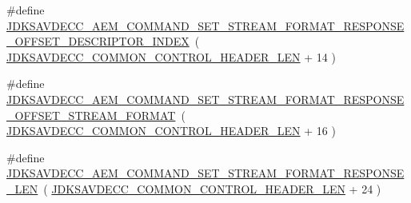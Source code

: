 \begin{DoxyCompactItemize}
\item 
\#define \hyperlink{group__command__set__stream__format__response_ga3fb2a3f714c01e45626ae8439f9d9793}{J\+D\+K\+S\+A\+V\+D\+E\+C\+C\+\_\+\+A\+E\+M\+\_\+\+C\+O\+M\+M\+A\+N\+D\+\_\+\+S\+E\+T\+\_\+\+S\+T\+R\+E\+A\+M\+\_\+\+F\+O\+R\+M\+A\+T\+\_\+\+R\+E\+S\+P\+O\+N\+S\+E\+\_\+\+O\+F\+F\+S\+E\+T\+\_\+\+D\+E\+S\+C\+R\+I\+P\+T\+O\+R\+\_\+\+I\+N\+D\+EX}~( \hyperlink{group__jdksavdecc__avtp__common__control__header_gaae84052886fb1bb42f3bc5f85b741dff}{J\+D\+K\+S\+A\+V\+D\+E\+C\+C\+\_\+\+C\+O\+M\+M\+O\+N\+\_\+\+C\+O\+N\+T\+R\+O\+L\+\_\+\+H\+E\+A\+D\+E\+R\+\_\+\+L\+EN} + 14 )
\item 
\#define \hyperlink{group__command__set__stream__format__response_gaab8a91838855f263277ddcf57418475a}{J\+D\+K\+S\+A\+V\+D\+E\+C\+C\+\_\+\+A\+E\+M\+\_\+\+C\+O\+M\+M\+A\+N\+D\+\_\+\+S\+E\+T\+\_\+\+S\+T\+R\+E\+A\+M\+\_\+\+F\+O\+R\+M\+A\+T\+\_\+\+R\+E\+S\+P\+O\+N\+S\+E\+\_\+\+O\+F\+F\+S\+E\+T\+\_\+\+S\+T\+R\+E\+A\+M\+\_\+\+F\+O\+R\+M\+AT}~( \hyperlink{group__jdksavdecc__avtp__common__control__header_gaae84052886fb1bb42f3bc5f85b741dff}{J\+D\+K\+S\+A\+V\+D\+E\+C\+C\+\_\+\+C\+O\+M\+M\+O\+N\+\_\+\+C\+O\+N\+T\+R\+O\+L\+\_\+\+H\+E\+A\+D\+E\+R\+\_\+\+L\+EN} + 16 )
\item 
\#define \hyperlink{group__command__set__stream__format__response_ga84ce58cd3f37ceba71eb7fd3db0a5c14}{J\+D\+K\+S\+A\+V\+D\+E\+C\+C\+\_\+\+A\+E\+M\+\_\+\+C\+O\+M\+M\+A\+N\+D\+\_\+\+S\+E\+T\+\_\+\+S\+T\+R\+E\+A\+M\+\_\+\+F\+O\+R\+M\+A\+T\+\_\+\+R\+E\+S\+P\+O\+N\+S\+E\+\_\+\+L\+EN}~( \hyperlink{group__jdksavdecc__avtp__common__control__header_gaae84052886fb1bb42f3bc5f85b741dff}{J\+D\+K\+S\+A\+V\+D\+E\+C\+C\+\_\+\+C\+O\+M\+M\+O\+N\+\_\+\+C\+O\+N\+T\+R\+O\+L\+\_\+\+H\+E\+A\+D\+E\+R\+\_\+\+L\+EN} + 24 )
\end{DoxyCompactItemize}
